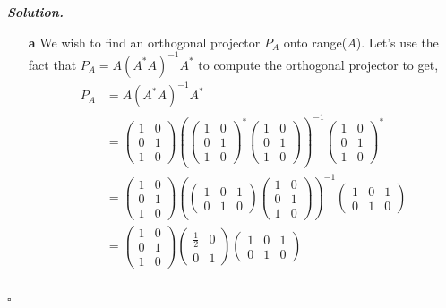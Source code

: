 \documentclass[12pt]{report}
\newenvironment{solution}[1][\it{Solution}]{\textbf{#1. } }{$\square$}
\begin{document}
\begin{solution}
    \begin{enumerate}
        \item [{\bf a}] We wish to find an orthogonal projector $P_A$ onto range($A$). Let's use the fact that $P_A = A(A^*A)^{-1}A^*$ to compute the orthogonal projector to get,
        \begin{align*}
            P_A &= A(A^*A)^{-1}A^*\\
            &= \begin{pmatrix}
                1&0\\0&1\\1&0
            \end{pmatrix}\left( \begin{pmatrix}
                1&0\\0&1\\1&0
            \end{pmatrix}^* \begin{pmatrix}
                1&0\\0&1\\1&0
            \end{pmatrix}\right)^{-1}\begin{pmatrix}
                1&0\\0&1\\1&0
            \end{pmatrix}^*\\
            &= \begin{pmatrix}
                1&0\\0&1\\1&0
            \end{pmatrix}\left( \begin{pmatrix}1&0&1\\ 0&1&0\end{pmatrix} \begin{pmatrix}
                1&0\\0&1\\1&0
            \end{pmatrix}\right)^{-1}\begin{pmatrix}1&0&1\\ 0&1&0\end{pmatrix}\\
            &= \begin{pmatrix}
                1&0\\0&1\\1&0
            \end{pmatrix}\begin{pmatrix}\frac{1}{2}&0\\ 0&1\end{pmatrix}\begin{pmatrix}1&0&1\\ 0&1&0\end{pmatrix}\\

\end{align*}
\end{enumerate}
\end{solution}
\end{document}
